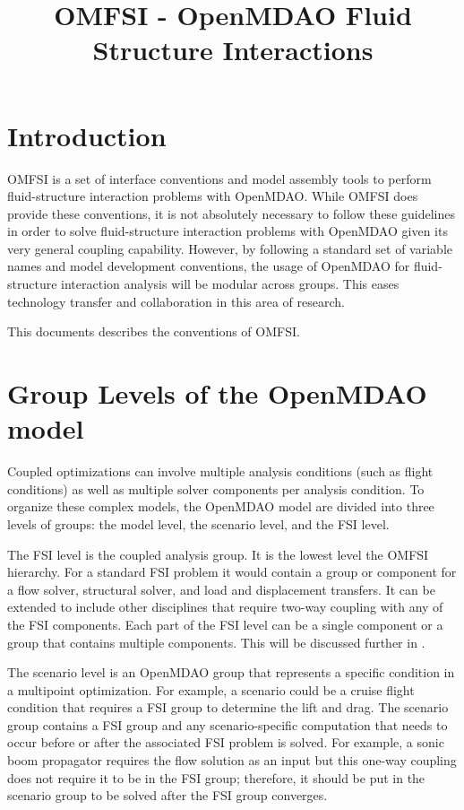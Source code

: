 \documentclass{article}
\title{OMFSI - OpenMDAO Fluid Structure Interactions}
\author{}
\begin{document}
\maketitle
\tableofcontents


\section{Introduction}

OMFSI is a set of interface conventions and model assembly tools to perform fluid-structure interaction problems with OpenMDAO.
While OMFSI does provide these conventions, it is not absolutely necessary to follow these guidelines in order to solve fluid-structure interaction problems with OpenMDAO given its very general coupling capability.
However, by following a standard set of variable names and model development conventions, the usage of OpenMDAO for fluid-structure interaction analysis will be modular across groups.
This eases technology transfer and collaboration in this area of research.


This documents describes the conventions of OMFSI.

\section{Group Levels of the OpenMDAO model}\label{sect:group_levels}

Coupled optimizations can involve multiple analysis conditions (such as flight conditions) as well as multiple solver components per analysis condition.
To organize these complex models, the OpenMDAO model are divided into three levels of groups: the model level, the scenario level, and the FSI level.

The FSI level is the coupled analysis group.
It is the lowest level the OMFSI hierarchy.
For a standard FSI problem it would contain a group or component for a flow solver, structural solver, and load and displacement transfers.
It can be extended to include other disciplines that require two-way coupling with any of the FSI components.
Each part of the FSI level can be a single component or a group that contains multiple components.
This will be discussed further in .

The scenario level is an OpenMDAO group that represents a specific condition in a multipoint optimization.
For example, a scenario could be a cruise flight condition that requires a FSI group to determine the lift and drag.
The scenario group contains a FSI group and any scenario-specific computation that needs to occur before or after the associated FSI problem is solved.
For example, a sonic boom propagator requires the flow solution as an input but this one-way coupling does not require it to be in the FSI group; therefore, it should be put in the scenario group to be solved after the FSI group converges.
\end{document}
